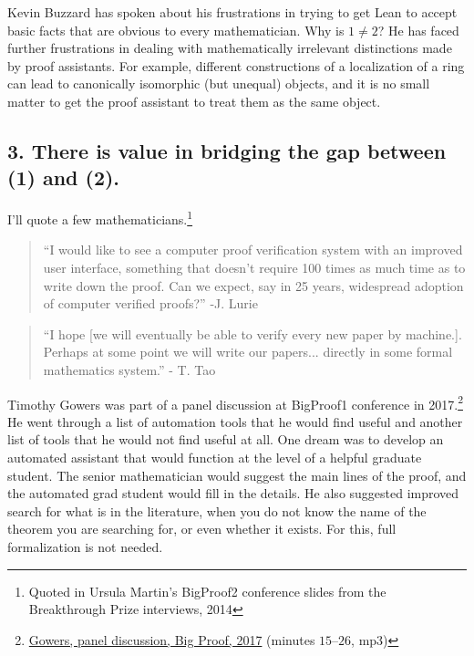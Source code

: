 \documentclass[12pt]{amsart}
\renewcommand{\~}{\ }
\renewcommand{\_}{\textunderscore}
\begin{document}
Kevin Buzzard has spoken about his frustrations in trying to get Lean
to accept basic facts that are obvious to every mathematician.  Why is
$1\ne 2$?  He has faced further frustrations in dealing with
mathematically irrelevant distinctions made by proof assistants. For
example, different constructions of a localization of a ring can lead
to canonically isomorphic (but unequal) objects, and it is no small
matter to get the proof assistant to treat them as the same object.


\subsection*{3. There is value in bridging the gap between (1) and (2).}

I'll quote a few mathematicians.\footnote{Quoted in Ursula Martin's
  BigProof2 conference slides from the Breakthrough Prize interviews, 2014}

\begin{quote}
  ``I would like to see a computer proof verification system with an
  improved user interface, something that doesn't require 100 times as
  much time as to write down the proof. Can we expect, say in 25
  years, widespread adoption of computer verified proofs?'' -J. Lurie
  \end{quote}

\begin{quote}
  ``I hope [we will eventually be able to verify every new paper by
    machine.]. Perhaps at some point we will write our
  papers... directly in some formal mathematics system.'' - T. Tao
\end{quote}

Timothy Gowers was part of a panel discussion at BigProof1 conference in
2017.\footnote{\href{https://www.newton.ac.uk/seminar/20170714143015301}{Gowers,
    panel discussion, Big Proof, 2017} (minutes $15$--$26$, mp3)} He
went through a list of automation tools that he would find useful and
another list of tools that he would not find useful at all.  One dream
was to develop an automated assistant that would function at the level
of a helpful graduate student.  The senior mathematician would suggest
the main lines of the proof, and the automated grad student would fill
in the details.  He also suggested improved search for what is in the
literature, when you do not know the name of the theorem you are
searching for, or even whether it exists.  For this, full
formalization is not needed.
\end{document}
